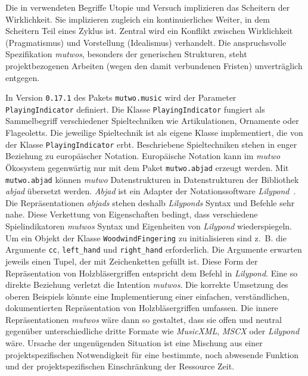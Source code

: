 \documentclass[12pt,a4paper,ngerman]{article}
\begin{document}
Die in \emph{} verwendeten Begriffe Utopie und Versuch implizieren das Scheitern der Wirklichkeit.
Sie implizieren zugleich ein kontinuierliches Weiter, in dem Scheitern Teil eines Zyklus ist.
Zentral wird ein Konflikt zwischen Wirklichkeit (Pragmatismus) und Vorstellung (Idealismus) verhandelt.
Die anspruchsvolle Spezifikation \emph{mutwos}, besonders der generischen Strukturen, steht projektbezogenen Arbeiten (wegen den damit verbundenen Fristen) unverträglich entgegen.

\smallskip

In Version \texttt{0.17.1} des Pakets \texttt{mutwo.music} wird der Parameter \texttt{PlayingIndicator} definiert.
Die Klasse \texttt{PlayingIndicator} fungiert als Sammelbegriff verschiedener Spieltechniken wie Artikulationen, Ornamente oder Flageoletts.
Die jeweilige Spieltechnik ist als eigene Klasse implementiert, die von der Klasse \texttt{PlayingIndicator} erbt.
Beschriebene Spieltechniken stehen in enger Beziehung zu europäischer Notation.
Europäische Notation kann im \emph{mutwo} Ökosystem gegenwärtig nur mit dem Paket \texttt{mutwo.abjad} erzeugt werden.
Mit \texttt{mutwo.abjad} können \emph{mutwo} Datenstrukturen in Datenstrukturen der Bibliothek \emph{abjad} übersetzt werden.
\emph{Abjad} ist ein Adapter der Notationssoftware \emph{Lilypond}~\parencite{abjadWelcome}.
Die Repräsentationen \emph{abjads} stehen deshalb \emph{Lilyponds} Syntax und Befehle sehr nahe.
Diese Verkettung von Eigenschaften bedingt, dass verschiedene Spielindikatoren \emph{mutwos} Syntax und Eigenheiten von \emph{Lilypond} wiederspiegeln.
Um ein Objekt der Klasse \texttt{WoodwindFingering} zu initialisieren sind z.~B. die Argumente \texttt{cc}, \texttt{left\_hand} und \texttt{right\_hand} erforderlich.
Die Argumente erwarten jeweils einen Tupel, der mit Zeichenketten gefüllt ist.
Diese Form der Repräsentation von Holzbläsergriffen entspricht dem Befehl in \emph{Lilypond}. 
Eine so direkte Beziehung verletzt die Intention \emph{mutwos}.
Die korrekte Umsetzung des oberen Beispiels könnte eine Implementierung einer einfachen, verständlichen, dokumentierten Repräsentation von Holzbläsergriffen umfassen.
Die innere Repräsentationen \emph{mutwos} wäre dann so gestaltet, dass sie offen und neutral gegenüber unterschiedliche dritte Formate wie \emph{MusicXML}, \emph{MSCX} oder \emph{Lilypond} wäre.
Ursache der ungenügenden Situation ist eine Mischung aus einer projektspezifischen Notwendigkeit für eine bestimmte, noch abwesende Funktion und der projektspezifischen Einschränkung der Ressource Zeit.
\end{document}
